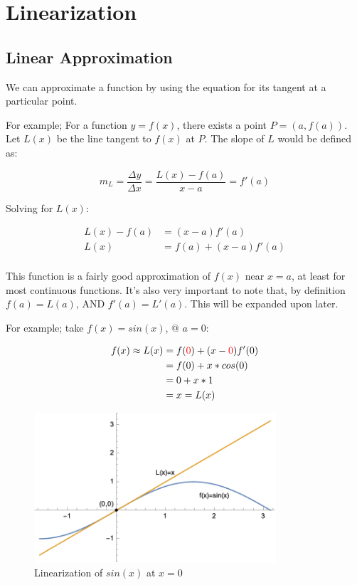 \documentclass[12pt]{article}
\begin{document}
\section{Linearization}\label{sec:linearization}
\subsection{Linear Approximation}
We can approximate a function by using the equation for its tangent at a particular point.

For example; For a function $y=f(x)$, there exists a point $P = (a, f(a))$. Let $L(x)$ be the line tangent to $f(x)$ at $P$. The slope of $L$ would be defined as:

$$m_L = \frac{\Delta y}{\Delta x} = \frac{L(x) - f(a)}{x - a} = f'(a)$$

Solving for $L(x)$:

\begin{equation}
    \begin{split}
        L(x) - f(a) &= (x-a)f'(a)\\
        L(x) &= f(a) + (x-a)f'(a)\\
    \end{split}
\end{equation}

This function is a fairly good approximation of $f(x)$ near $x=a$, at least for most continuous functions. It's also very important to note that, by definition $f(a) = L(a)$, AND $f'(a) = L'(a)$. This will be expanded upon later.

For example; take $f(x) = sin(x)$, @ $a=0$:

\begin{equation}
    \begin{split}
        f(x) \approx L(x) &= f(\textcolor{red}{0}) + (x-\textcolor{red}{0})f'(0)\\
        &= f(0) + x*cos(0)\\
        &= 0 + x*1\\
        &= x = L(x)
    \end{split}
\end{equation}

\begin{figure}
    \centering
    \includegraphics[width=9cm]{misc/linearizationofsinx.png}
    \caption{Linearization of $sin(x)$ at $x=0$}
\end{figure}
\end{document}
